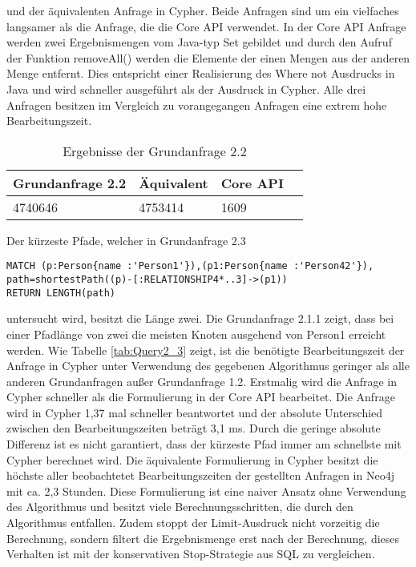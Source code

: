  und der äquivalenten Anfrage in Cypher. Beide Anfragen sind um ein vielfaches langsamer als die Anfrage, die die Core API verwendet. In der Core API Anfrage werden zwei Ergebnismengen vom Java-typ Set gebildet und durch den Aufruf der Funktion removeAll() werden die Elemente der einen Mengen aus der anderen Menge entfernt. Dies entspricht einer Realisierung des Where not Ausdrucks in Java und wird schneller ausgeführt als der Ausdruck in Cypher. Alle drei Anfragen besitzen im Vergleich zu vorangegangen Anfragen eine extrem hohe Bearbeitungszeit.
\FloatBarrier
\begin{table}[h]
	\centering
		\begin{tabular}{ |p{3cm}|p{3cm}|p{3cm}|p{3cm}|  }
			\hline
			Grundanfrage 2.2 & Äquivalent&Core API\\
			\hline
			4740646    & 4753414 &  1609\\
			\hline
		\end{tabular}
		\caption{Ergebnisse der Grundanfrage 2.2}
		\label{tab:Query2_2}
\end{table}
\FloatBarrier
\noindent Der kürzeste Pfade, welcher in Grundanfrage 2.3
\begin{Verbatim}[frame=single]
MATCH (p:Person{name :'Person1'}),(p1:Person{name :'Person42'}),
path=shortestPath((p)-[:RELATIONSHIP4*..3]->(p1)) 
RETURN LENGTH(path)
\end{Verbatim} 
 untersucht wird, besitzt die Länge zwei. Die Grundanfrage 2.1.1 zeigt, dass bei einer Pfadlänge von zwei die meisten Knoten ausgehend von Person1 erreicht werden. Wie Tabelle \ref{tab:Query2_3} zeigt, ist die benötigte Bearbeitungszeit der Anfrage in Cypher unter Verwendung des gegebenen Algorithmus geringer als alle anderen Grundanfragen außer Grundanfrage 1.2. Erstmalig wird die Anfrage in Cypher schneller als die Formulierung in der Core API bearbeitet. Die Anfrage wird in Cypher 1,37 mal schneller beantwortet und  der absolute Unterschied zwischen den Bearbeitungszeiten beträgt 3,1 ms. Durch die geringe absolute Differenz ist es nicht garantiert, dass der kürzeste Pfad immer am schnellste mit Cypher berechnet wird. \newline
Die äquivalente Formulierung in Cypher besitzt die höchste aller beobachtetet Bearbeitungszeiten der gestellten Anfragen in Neo4j mit ca. 2,3 Stunden. Diese Formulierung ist eine naiver Ansatz ohne Verwendung des Algorithmus und besitzt viele Berechnungsschritten, die durch den Algorithmus entfallen. Zudem stoppt der Limit-Ausdruck nicht vorzeitig die Berechnung, sondern filtert die Ergebnismenge erst nach der Berechnung, dieses Verhalten ist mit der konservativen Stop-Strategie aus SQL zu vergleichen\parencite{carey1997saying}.   
